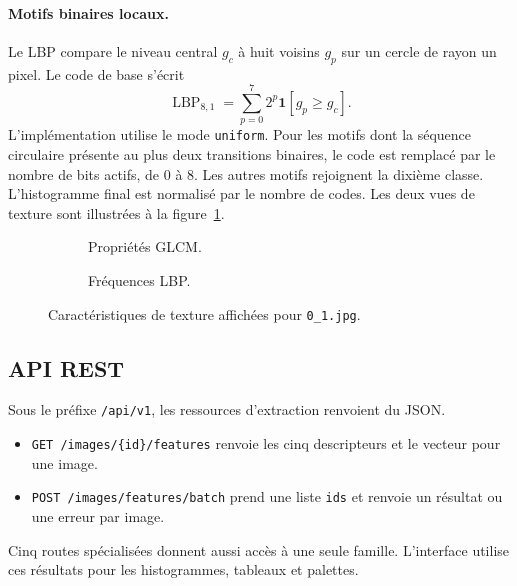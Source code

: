 \paragraph{Motifs binaires locaux.}
Le LBP compare le niveau central \(g_c\) à huit voisins \(g_p\) sur un cercle de rayon un pixel. Le code de base s'écrit
\begin{equation}
  \operatorname{LBP}_{8,1}=\sum_{p=0}^{7} 2^p\mathbf{1}[g_p\geq g_c].
  \label{eq:lbp}
\end{equation}
L'implémentation utilise le mode \texttt{uniform}. Pour les motifs dont la séquence circulaire présente au plus deux transitions binaires, le code est remplacé par le nombre de bits actifs, de 0 à 8. Les autres motifs rejoignent la dixième classe. L'histogramme final est normalisé par le nombre de codes. Les deux vues de texture sont illustrées à la figure~\ref{fig:textures}.

\begin{figure}[ht]
  \centering
  \begin{subfigure}[t]{0.49\linewidth}
    \centering
    \caption{Propriétés GLCM.}
  \end{subfigure}\hfill
  \begin{subfigure}[t]{0.49\linewidth}
    \centering
    \caption{Fréquences LBP.}
  \end{subfigure}
  \caption{Caractéristiques de texture affichées pour \texttt{0\_1.jpg}.}
  \label{fig:textures}
\end{figure}

\subsection{API REST}
Sous le préfixe \texttt{/api/v1}, les ressources d'extraction renvoient du JSON.
\begin{itemize}[leftmargin=*]
  \item \texttt{GET /images/\{id\}/features} renvoie les cinq descripteurs et le vecteur pour une image.
  \item \texttt{POST /images/features/batch} prend une liste \texttt{ids} et renvoie un résultat ou une erreur par image.
\end{itemize}
Cinq routes spécialisées donnent aussi accès à une seule famille. L'interface utilise ces résultats pour les histogrammes, tableaux et palettes.
